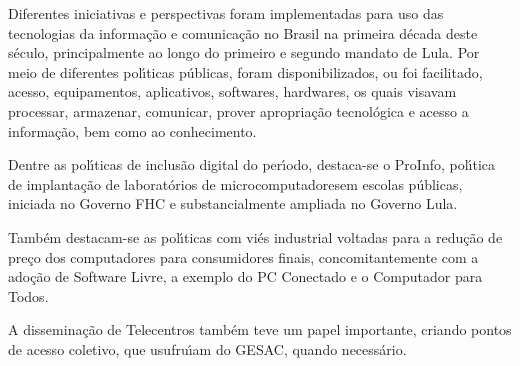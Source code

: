 \documentclass[
12pt,		%
openright,	%
twoside,  %
a4paper,			%
chapter=TITLE,		%
english,			%
french,				%
spanish,			%
brazil				%
]{USPSC-classe/USPSC}
\begin{document}
Diferentes iniciativas e perspectivas foram implementadas para uso das tecnologias da informa\c{c}\~ao e comunica\c{c}\~ao no Brasil na primeira d\'ecada deste s\'eculo, principalmente ao longo do primeiro e segundo mandato de Lula. Por meio de diferentes pol\'{\i}ticas p\'ublicas, foram disponibilizados, ou foi facilitado, acesso, equipamentos, aplicativos, softwares, hardwares, os quais visavam processar, armazenar, comunicar, prover apropria\c{c}\~ao tecnol\'ogica e acesso a  informa\c{c}\~ao, bem como ao conhecimento.

















Dentre as pol\'{\i}ticas de inclus\~ao digital do per\'{\i}odo, destaca-se o ProInfo, pol\'{\i}tica de implanta\c{c}\~ao de \textquotedbl laborat\'orios de microcomputadores\textquotedbl  em escolas p\'ublicas, iniciada no Governo FHC e substancialmente ampliada no Governo Lula.

















Tamb\'em destacam-se as pol\'{\i}ticas com vi\'es industrial voltadas para a redu\c{c}\~ao de pre\c{c}o dos computadores para consumidores finais, concomitantemente com a ado\c{c}\~ao de Software Livre, a exemplo do PC Conectado e o Computador para Todos.

















A dissemina\c{c}\~ao de Telecentros tamb\'em teve um papel importante, criando pontos de acesso coletivo, que usufru\'{\i}am do GESAC, quando necess\'ario.
\end{document}
